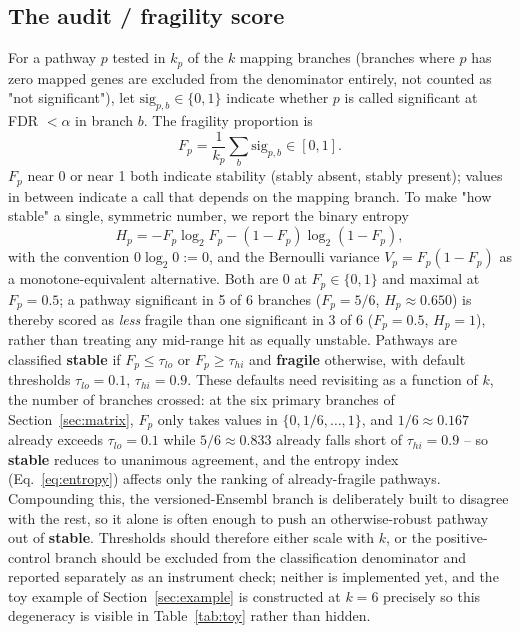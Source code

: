 \documentclass[webpdf,contemporary,large]{oup-authoring-template}
\theoremstyle{thmstyleone}%
\theoremstyle{thmstyletwo}%
\theoremstyle{thmstylethree}%
\begin{document}
\subsection{The audit / fragility score}\label{sec:fragility}

For a pathway $p$ tested in $k_p$ of the $k$ mapping branches (branches where $p$ has zero mapped genes are excluded from the denominator entirely, not counted as "not significant"), let $\mathrm{sig}_{p,b}\in\{0,1\}$ indicate whether $p$ is called significant at FDR $<\alpha$ in branch $b$. The fragility proportion is
\begin{equation}
F_p = \frac{1}{k_p}\sum_{b} \mathrm{sig}_{p,b} \in [0,1].
\label{eq:fragility}
\end{equation}
$F_p$ near 0 or near 1 both indicate stability (stably absent, stably present); values in between indicate a call that depends on the mapping branch. To make "how stable" a single, symmetric number, we report the binary entropy
\begin{equation}
H_p = -F_p\log_2 F_p - (1-F_p)\log_2(1-F_p),
\label{eq:entropy}
\end{equation}
with the convention $0\log_2 0 := 0$, and the Bernoulli variance $V_p = F_p(1-F_p)$ as a monotone-equivalent alternative. Both are 0 at $F_p\in\{0,1\}$ and maximal at $F_p=0.5$; a pathway significant in 5 of 6 branches ($F_p=5/6$, $H_p\approx0.650$) is thereby scored as \emph{less} fragile than one significant in 3 of 6 ($F_p=0.5$, $H_p=1$), rather than treating any mid-range hit as equally unstable. Pathways are classified \textbf{stable} if $F_p\le\tau_{lo}$ or $F_p\ge\tau_{hi}$ and \textbf{fragile} otherwise, with default thresholds $\tau_{lo}=0.1$, $\tau_{hi}=0.9$. These defaults need revisiting as a function of $k$, the number of branches crossed: at the six primary branches of Section~\ref{sec:matrix}, $F_p$ only takes values in $\{0,1/6,\ldots,1\}$, and $1/6\approx0.167$ already exceeds $\tau_{lo}=0.1$ while $5/6\approx0.833$ already falls short of $\tau_{hi}=0.9$ -- so \textbf{stable} reduces to unanimous agreement, and the entropy index (Eq.~\ref{eq:entropy}) affects only the ranking of already-fragile pathways. Compounding this, the versioned-Ensembl branch is deliberately built to disagree with the rest, so it alone is often enough to push an otherwise-robust pathway out of \textbf{stable}. Thresholds should therefore either scale with $k$, or the positive-control branch should be excluded from the classification denominator and reported separately as an instrument check; neither is implemented yet, and the toy example of Section~\ref{sec:example} is constructed at $k=6$ precisely so this degeneracy is visible in Table~\ref{tab:toy} rather than hidden.
\end{document}
